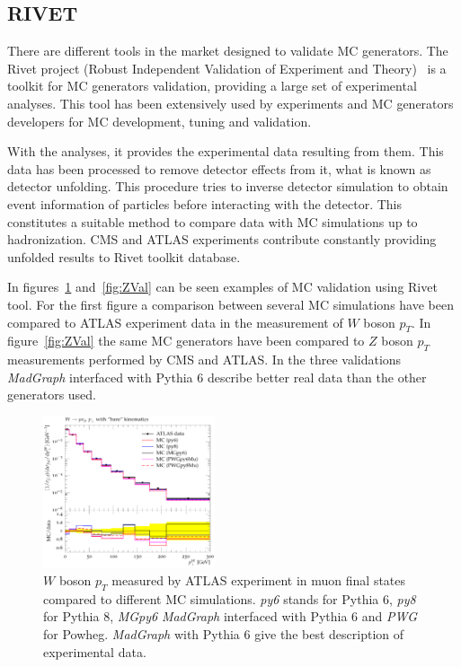 \subsection{RIVET}
\label{sec:rivet}

There are different tools in the market designed to validate MC generators. The Rivet project (Robust Independent Validation of Experiment and Theory)~\cite{Buckley:2010ar} is a toolkit for MC generators validation, providing a large set of experimental analyses. This tool has been extensively used by experiments and MC generators developers for MC development, tuning and validation. 

With the analyses, it provides the experimental data resulting from them. This data has been processed to remove detector effects from it, what is known as detector unfolding. This procedure tries to inverse detector simulation to obtain event information of particles before interacting with the detector. This constitutes a suitable method to compare data with MC simulations up to hadronization. CMS and ATLAS experiments contribute constantly providing unfolded results to Rivet toolkit database.

In figures~\ref{fig:WVal} and~\ref{fig:ZVal} can be seen examples of MC validation using Rivet tool. For the first figure a comparison between several MC simulations have been compared to ATLAS experiment data in the measurement of $W$ boson $p_{T}$. In figure~\ref{fig:ZVal} the same MC generators have been compared to $Z$ boson $p_{T}$ measurements performed by CMS and ATLAS. In the three validations \textit{MadGraph} interfaced with Pythia 6 describe better real data than the other generators used. 

\begin{figure}[!Hhtbp]
  \begin{center}
    \includegraphics[width=0.45\textwidth]{figs/Wpt_rivet.png}
    \caption{$W$ boson $p_{T}$ measured by ATLAS experiment in muon final states compared to different MC simulations. \textit{py6} stands for Pythia 6, \textit{py8} for Pythia 8, \textit{MGpy6} \textit{MadGraph} interfaced with Pythia 6 and \textit{PWG} for Powheg. \textit{MadGraph} with Pythia 6 give the best description of experimental data.}
    \label{fig:WVal}
  \end{center}
\end{figure}

